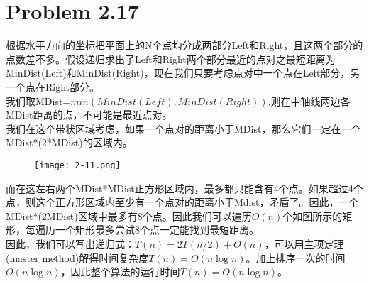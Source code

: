 \documentclass[twocolumn]{ctexart}
\begin{document}
\section*{Problem 2.17}
\indent 根据水平方向的坐标把平面上的N个点均分成两部分Left和Right，且这两个部分的点数差不多。假设递归求出了Left和Right两个部分最近的点对之最短距离为MinDist(Left)和MinDist(Right)，现在我们只要考虑点对中一个点在Left部分，另一个点在Right部分。\\
\indent 我们取MDist=$min(MinDist(Left),MinDist(Right))$,则在中轴线两边各MDist距离的点，不可能是最近点对。\\
\indent 我们在这个带状区域考虑，如果一个点对的距离小于MDist，那么它们一定在一个MDist*(2*MDist)的区域内。\\
\begin{figure}[!h]
	\centering
	\texttt{[image: 2-11.png]}
	\caption{}\label{fig:digit}
\end{figure}
\indent 而在这左右两个MDist*MDist正方形区域内，最多都只能含有4个点。如果超过4个点，则这个正方形区域内至少有一个点对的距离小于Mdist，矛盾了。因此，一个MDist*(2MDist)区域中最多有8个点。因此我们可以遍历$O(n)$个如图所示的矩形，每遍历一个矩形最多尝试8个点一定能找到最短距离。\\
 \indent 因此，我们可以写出递归式：$T(n)=2T(n/2)+O(n)$，可以用主项定理(master method)解得时间复杂度$T(n)=O(n\log{n})$。加上排序一次的时间$O(n\log{n})$，因此整个算法的运行时间$T(n)= O(n\log{n})$。
\end{document}
